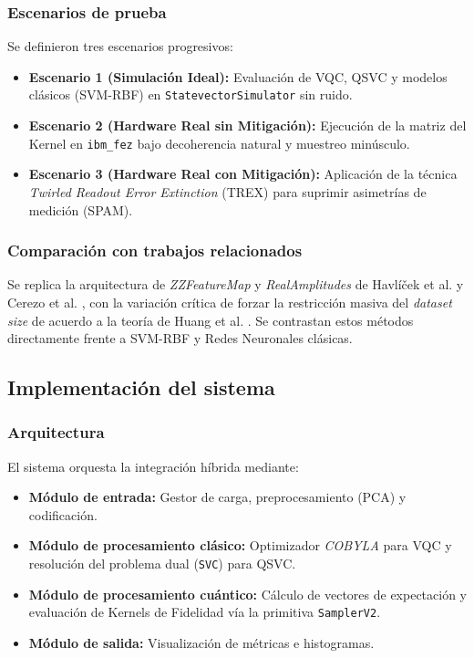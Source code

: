 \subsubsection{Escenarios de prueba}
Se definieron tres escenarios progresivos:
\begin{itemize}
    \item \textbf{Escenario 1 (Simulaci\'on Ideal):} Evaluaci\'on de VQC, QSVC y modelos cl\'asicos (SVM-RBF) en \texttt{StatevectorSimulator} sin ruido.
    \item \textbf{Escenario 2 (Hardware Real sin Mitigaci\'on):} Ejecuci\'on de la matriz del Kernel en \texttt{ibm\_fez} bajo decoherencia natural y muestreo min\'usculo.
    \item \textbf{Escenario 3 (Hardware Real con Mitigaci\'on):} Aplicaci\'on de la t\'ecnica \textit{Twirled Readout Error Extinction} (TREX) para suprimir asimetr\'ias de medici\'on (SPAM).
\end{itemize}

\subsubsection{Comparaci\'on con trabajos relacionados}
Se replica la arquitectura de \textit{ZZFeatureMap} y \textit{RealAmplitudes} de Havl\'i\v{c}ek et al. \citep{havlicek2019} y Cerezo et al. \citep{cerezo2021}, con la variaci\'on cr\'itica de forzar la restricci\'on masiva del \textit{dataset size} de acuerdo a la teor\'ia de Huang et al. \citep{huang2021}. Se contrastan estos m\'etodos directamente frente a SVM-RBF y Redes Neuronales cl\'asicas.

\subsection{Implementaci\'on del sistema}

\subsubsection{Arquitectura}
El sistema orquesta la integraci\'on h\'ibrida mediante:
\begin{itemize}
    \item \textbf{M\'odulo de entrada:} Gestor de carga, preprocesamiento (PCA) y codificaci\'on.
    \item \textbf{M\'odulo de procesamiento cl\'asico:} Optimizador \textit{COBYLA} para VQC y resoluci\'on del problema dual (\texttt{SVC}) para QSVC.
    \item \textbf{M\'odulo de procesamiento cu\'antico:} C\'alculo de vectores de expectaci\'on y evaluaci\'on de Kernels de Fidelidad v\'ia la primitiva \texttt{SamplerV2}.
    \item \textbf{M\'odulo de salida:} Visualizaci\'on de m\'etricas e histogramas.
\end{itemize}

